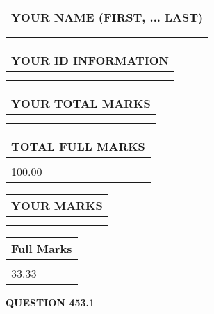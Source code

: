 \documentclass{ctexart}
\begin{document}
   
   
   
\newpage 
\setcounter{page}{ 
   453001 } 
   
   
   
   
\noindent\begin{tabular}{|l|}
\hline
YOUR NAME (FIRST, ... LAST)  \\
\hline
 \\ 
 \\ 
\hline
\end{tabular}
\hspace{0.05in} \begin{tabular}{|l|}
\hline
 YOUR   ID   INFORMATION  \\
\hline
 \\ 
 \\ 
\hline
\end{tabular}
   
   
\vspace{0.2in}\noindent\begin{tabular}{|l|}
\hline
YOUR TOTAL MARKS  \\
\hline
 \\ 
 \\ 
\hline
\end{tabular}
\hspace{0.05in} \begin{tabular}{|l|}
\hline
TOTAL FULL MARKS  \\
\hline
 \\ 
100.00 \\
\hline
\end{tabular}
   
   
 \vspace{0.2in}
 
 
 
 
   
   
  
\vspace{0.2in}
  
\noindent\begin{tabular}{|l|}
\hline
 YOUR MARKS  \\
\hline
 \\ 
 \\ 
\hline
\end{tabular}
\hspace{0.05in} \begin{tabular}{|l|}
\hline
 Full Marks  \\
\hline
 \\ 
33.33 \\
\hline
\end{tabular}
{\textbf{\Large{QUESTION
453.1 
}}}
  
\end{document}
